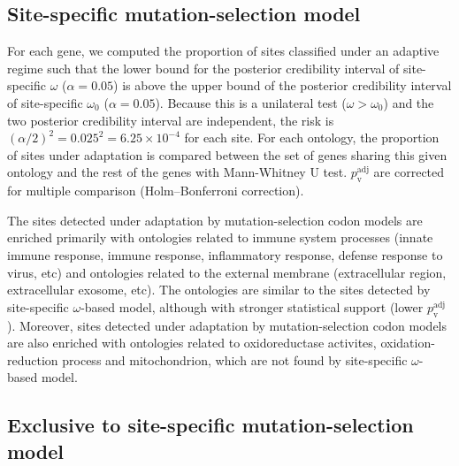 \documentclass{article}
\begin{document}
    \subsection{Site-specific mutation-selection model}
    \label{subsec:mutation-selection-codon-method}

    For each gene, we computed the proportion of sites classified under an adaptive regime such that the lower bound for the posterior credibility interval of site-specific $\omega$ ($\alpha=0.05$) is above the upper bound of the posterior credibility interval of site-specific $\omega_{0}$ ($\alpha=0.05$).
    Because this is a unilateral test ($\omega > \omega_{0}$) and the two posterior credibility interval are independent, the risk is $(\alpha/2)^2=0.025^2=6.25 \times 10^{-4}$ for each site.
    For each ontology, the proportion of sites under adaptation is compared between the set of genes sharing this given ontology and the rest of the genes with Mann-Whitney U test.
    $p_{\mathrm{v}}^{\mathrm{adj}}$ are corrected for multiple comparison (Holm–Bonferroni correction).

    \begin{center}
        \footnotesize
        
    \end{center}
    The sites detected under adaptation by mutation-selection codon models are enriched primarily with ontologies related to immune system processes (innate immune response, immune response, inflammatory response, defense response to virus, etc) and ontologies related to the external membrane (extracellular region, extracellular exosome, etc).
    The ontologies are similar to the sites detected by site-specific $\omega$-based model, although with stronger statistical support (lower $p_{\mathrm{v}}^{\mathrm{adj}}$).
    Moreover, sites detected under adaptation by mutation-selection codon models are also enriched with ontologies related to oxidoreductase activites, oxidation-reduction process and mitochondrion, which are not found by site-specific $\omega$-based model.

    \subsection{Exclusive to site-specific mutation-selection model}
    \label{subsec:exclusive-to-mutation-selection-codon-method}
\end{document}
